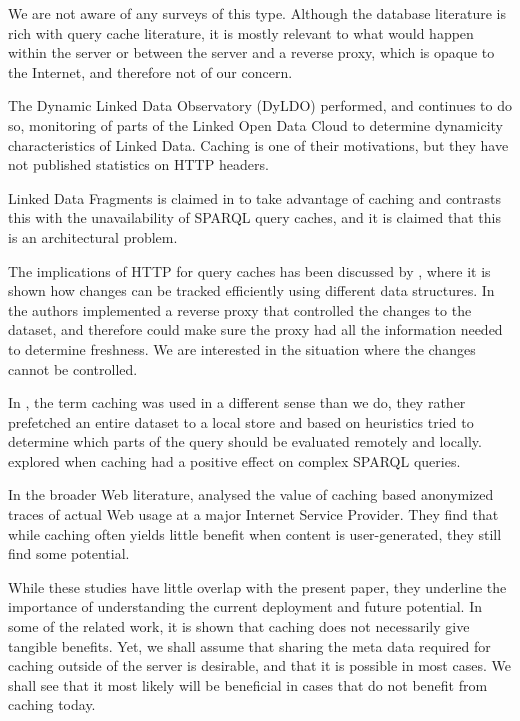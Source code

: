 \documentclass{llncs}
\begin{document}
We are not aware of any surveys of this type. Although the database
literature is rich with query cache literature, it is mostly relevant
to what would happen within the server or between the server and a
reverse proxy, which is opaque to the Internet, and therefore not of
our concern.

The \cite{dyldo2} Dynamic Linked Data Observatory (DyLDO) performed,
and continues to do so, monitoring of parts of the Linked Open Data
Cloud to determine dynamicity characteristics of Linked Data. Caching
is one of their motivations, but they have not published statistics on
HTTP headers.

Linked Data Fragments is claimed in \cite{ldf1} to take advantage of
caching and contrasts this with the unavailability of SPARQL query
caches, and it is claimed that this is an architectural problem.

The implications of HTTP for query caches has been discussed by
\cite{kaseicache}, where it is shown how changes can be tracked
efficiently using different data structures. In \cite{sparqlproxy} the
authors implemented a reverse proxy that controlled the changes to the
dataset, and therefore could make sure the proxy had all the
information needed to determine freshness. We are interested in the
situation where the changes cannot be controlled.

In \cite{umbrich2012hybrid}, the term caching was used in a different
sense than we do, they rather prefetched an entire dataset to a local
store and based on heuristics tried to determine which parts of the
query should be evaluated remotely and locally. \cite{lampo2011cache}
explored when caching had a positive effect on complex SPARQL
queries.

In the broader Web literature, \cite{ager2010revisiting} analysed the
value of caching based anonymized traces of actual Web usage at a
major Internet Service Provider. They find that while caching often
yields little benefit when content is user-generated, they still find
some potential.

While these studies have little overlap with the present paper, they
underline the importance of understanding the current deployment and
future potential. In some of the related work, it is shown that
caching does not necessarily give tangible benefits. Yet, we shall
assume that sharing the meta data required for caching outside of the
server is desirable, and that it is possible in most cases. We shall
see that it most likely will be beneficial in cases that do not
benefit from caching today.
\end{document}
